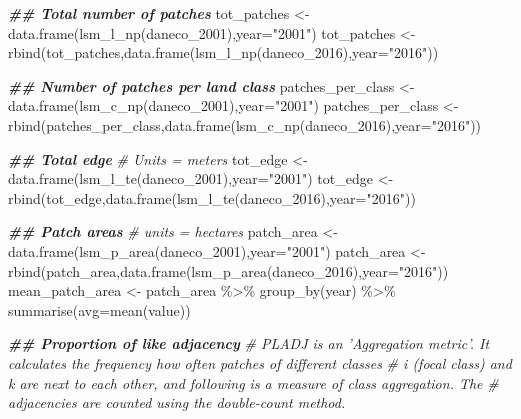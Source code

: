 \documentclass[
]{article}
\newenvironment{Shaded}{\begin{snugshade}}{\end{snugshade}}
\newcommand{\AttributeTok}[1]{\textcolor[rgb]{0.77,0.63,0.00}{#1}}
\newcommand{\CommentTok}[1]{\textcolor[rgb]{0.56,0.35,0.01}{\textit{#1}}}
\newcommand{\DocumentationTok}[1]{\textcolor[rgb]{0.56,0.35,0.01}{\textbf{\textit{#1}}}}
\newcommand{\FunctionTok}[1]{\textcolor[rgb]{0.00,0.00,0.00}{#1}}
\newcommand{\NormalTok}[1]{#1}
\newcommand{\OtherTok}[1]{\textcolor[rgb]{0.56,0.35,0.01}{#1}}
\newcommand{\SpecialCharTok}[1]{\textcolor[rgb]{0.00,0.00,0.00}{#1}}
\newcommand{\StringTok}[1]{\textcolor[rgb]{0.31,0.60,0.02}{#1}}
\begin{document}
\begin{Shaded}
\begin{Highlighting}[]
\DocumentationTok{\#\# Total number of patches}
\NormalTok{tot\_patches }\OtherTok{\textless{}{-}} \FunctionTok{data.frame}\NormalTok{(}\FunctionTok{lsm\_l\_np}\NormalTok{(daneco\_2001),}\AttributeTok{year=}\StringTok{"2001"}\NormalTok{)}
\NormalTok{tot\_patches }\OtherTok{\textless{}{-}} \FunctionTok{rbind}\NormalTok{(tot\_patches,}\FunctionTok{data.frame}\NormalTok{(}\FunctionTok{lsm\_l\_np}\NormalTok{(daneco\_2016),}\AttributeTok{year=}\StringTok{"2016"}\NormalTok{))}

\DocumentationTok{\#\# Number of patches per land class}
\NormalTok{patches\_per\_class }\OtherTok{\textless{}{-}} \FunctionTok{data.frame}\NormalTok{(}\FunctionTok{lsm\_c\_np}\NormalTok{(daneco\_2001),}\AttributeTok{year=}\StringTok{"2001"}\NormalTok{)}
\NormalTok{patches\_per\_class }\OtherTok{\textless{}{-}} \FunctionTok{rbind}\NormalTok{(patches\_per\_class,}\FunctionTok{data.frame}\NormalTok{(}\FunctionTok{lsm\_c\_np}\NormalTok{(daneco\_2016),}\AttributeTok{year=}\StringTok{"2016"}\NormalTok{))}

\DocumentationTok{\#\# Total edge}
\CommentTok{\# Units = meters}
\NormalTok{tot\_edge }\OtherTok{\textless{}{-}} \FunctionTok{data.frame}\NormalTok{(}\FunctionTok{lsm\_l\_te}\NormalTok{(daneco\_2001),}\AttributeTok{year=}\StringTok{"2001"}\NormalTok{)}
\NormalTok{tot\_edge }\OtherTok{\textless{}{-}} \FunctionTok{rbind}\NormalTok{(tot\_edge,}\FunctionTok{data.frame}\NormalTok{(}\FunctionTok{lsm\_l\_te}\NormalTok{(daneco\_2016),}\AttributeTok{year=}\StringTok{"2016"}\NormalTok{))}

\DocumentationTok{\#\# Patch areas}
\CommentTok{\# units = hectares}
\NormalTok{patch\_area }\OtherTok{\textless{}{-}} \FunctionTok{data.frame}\NormalTok{(}\FunctionTok{lsm\_p\_area}\NormalTok{(daneco\_2001),}\AttributeTok{year=}\StringTok{"2001"}\NormalTok{)}
\NormalTok{patch\_area }\OtherTok{\textless{}{-}} \FunctionTok{rbind}\NormalTok{(patch\_area,}\FunctionTok{data.frame}\NormalTok{(}\FunctionTok{lsm\_p\_area}\NormalTok{(daneco\_2016),}\AttributeTok{year=}\StringTok{"2016"}\NormalTok{))}
\NormalTok{mean\_patch\_area }\OtherTok{\textless{}{-}}\NormalTok{ patch\_area }\SpecialCharTok{\%\textgreater{}\%} \FunctionTok{group\_by}\NormalTok{(year) }\SpecialCharTok{\%\textgreater{}\%} \FunctionTok{summarise}\NormalTok{(}\AttributeTok{avg=}\FunctionTok{mean}\NormalTok{(value))}

\DocumentationTok{\#\# Proportion of like adjacency}
\CommentTok{\# PLADJ is an ’Aggregation metric’. It calculates the frequency how often patches of different classes}
\CommentTok{\# i (focal class) and k are next to each other, and following is a measure of class aggregation. The}
\CommentTok{\# adjacencies are counted using the double{-}count method.}


\end{Highlighting}
\end{Shaded}
\end{document}
